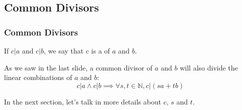 \subsection{Common Divisors}

\begin{frame}
  \frametitle{Common Divisors}

    If $c|a$ and $c|b$, we say that c is a  of $a$ and $b$.\bigskip

    As we saw in the last slide, a common divisor of $a$ and $b$ will also divide the linear combinations of $a$ and $b$:
    \begin{equation*}
      c|a \land c|b \implies \forall s,t\in\mathbb{N}, c|(sa+tb)
    \end{equation*}\bigskip

    In the next section, let's talk in more details about $c$, $s$ and $t$.
\end{frame}

